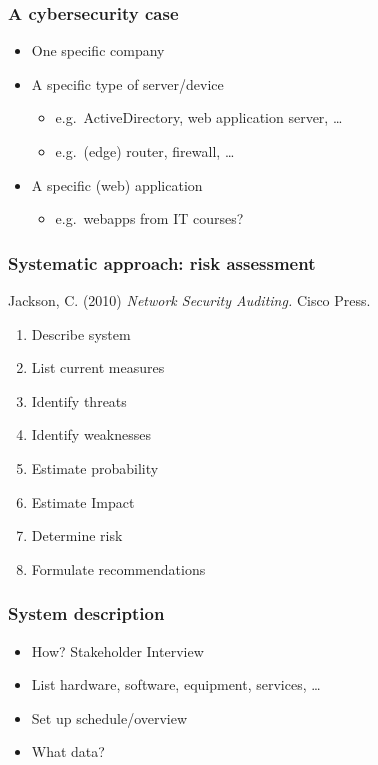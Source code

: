 \documentclass[aspectratio=169]{beamer}
\begin{document}
\begin{frame}
  \frametitle{A cybersecurity case}

  \begin{itemize}
    \item One specific company
    \item A specific type of server/device
          \begin{itemize}
            \item e.g.\ ActiveDirectory, web application server, \ldots
            \item e.g.\ (edge) router, firewall, \ldots
          \end{itemize}
    \item A specific (web) application
          \begin{itemize}
            \item e.g.\ webapps from IT courses?
          \end{itemize}
  \end{itemize}

\end{frame}

\begin{frame}
  \frametitle{Systematic approach: risk assessment}

  Jackson, C. (2010) \textit{Network Security Auditing.} Cisco Press.

  \begin{enumerate}
    \item Describe system
    \item List current measures
    \item Identify threats
    \item Identify weaknesses
    \item Estimate probability
    \item Estimate Impact
    \item Determine risk
    \item Formulate recommendations
  \end{enumerate}

\end{frame}

\begin{frame}
  \frametitle{System description}

  \begin{itemize}
    \item How? Stakeholder Interview
    \item List hardware, software, equipment, services, \ldots
    \item Set up schedule/overview
    \item What data?
  \end{itemize}

\end{frame}
\end{document}
